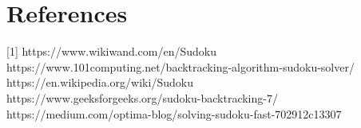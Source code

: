 \documentclass[11pt]{report}
\begin{document}
    \section{References}
        [1] https://www.wikiwand.com/en/Sudoku \label{sec:wikiwand}\\
            https://www.101computing.net/backtracking-algorithm-sudoku-solver/ \\
            https://en.wikipedia.org/wiki/Sudoku\\
            https://www.geeksforgeeks.org/sudoku-backtracking-7/ \\
            https://medium.com/optima-blog/solving-sudoku-fast-702912c13307 \\
\end{document}
